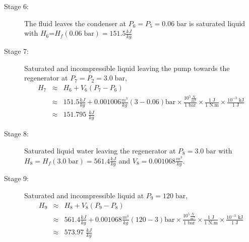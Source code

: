 \documentclass[calculator,steamtables,refrigeranttables,psychrometricchart,datasheet,solutions]{exam}
\newcommand{\frc}{\displaystyle\frac}
\begin{document}
\begin{question}
\begin{enumerate}[(a)]
{\begin{description}
\item [Stage 6:] The fluid leaves the condenser at $P_{6}=P_{5}=0.06\;\text{bar}$ is saturated liquid with $H_{6}$=$H_{f}\left(0.06\;\text{bar}\right)=151.5\frc{kJ}{kg}$~

\item [Stage 7:] Saturated and incompressible liquid leaving the pump towards the regenerator at $P_{7}=P_{2}=3.0\;\text{bar}$,~
\begin{eqnarray}
H_{7}&\approx& H_{6} + V_{6}\left(P_{7}-P_{6}\right) \nonumber \\
                     &\approx& 151.5 \frc{kJ}{kg} + 0.001006 \frc{m^{3}}{kg}\left(3-0.06\right)\text{bar} \times \frc{10^{5} \frc{N}{m^{2}}}{1\text{ bar}} \times \frc{1\text{ J}}{1\text{ N.m}} \times \frc{10^{-3}\text{ kJ}}{1\text{ J}} \nonumber \\
     &\approx& 151.795\;\frc{kJ}{kg} \nonumber
\end{eqnarray}

\item [Stage 8:] Saturated liquid water leaving the regenerator at $P_{8}=3.0\;\text{bar}$ with $H_{8}=H_{f}\left(3.0\;\text{bar}\right)=561.4\frc{kJ}{kg}$ and $V_{8}=0.001068\frc{m^{3}}{kg}$.

\item[Stage 9:] Saturated and incompressible liquid at $P_{9}=120\;\text{bar}$,~
\begin{eqnarray}
H_{9}&\approx& H_{8} + V_{8}\left(P_{9}-P_{8}\right) \nonumber \\
                     &\approx& 561.4 \frc{kJ}{kg} + 0.001068 \frc{m^{3}}{kg}\left(120-3\right)\text{bar}  \times \frc{10^{5} \frc{N}{m^{2}}}{1\text{ bar}} \times \frc{1\text{ J}}{1\text{ N.m}} \times \frc{10^{-3}\text{ kJ}}{1\text{ J}} \nonumber \\
     &\approx& 573.97\;\frc{kJ}{kg} \nonumber
\end{eqnarray}

\end{description}

}
\end{enumerate}
\end{question}
\end{document}
